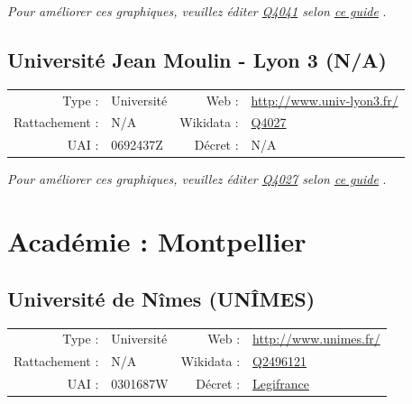 \documentclass[12pt,french,landscape]{article}
\begin{document}
\textit{\scriptsize Pour améliorer ces graphiques, veuillez éditer \href{https://www.wikidata.org/entity/Q4041}{Q4041}  selon \href{https://github.com/cpesr/wikidataESR/blob/master/Rmd/wikidataESR.md}{ce guide}}
.


\newpage

\hypertarget{universituxe9-jean-moulin---lyon-3-na}{%
\subsection{Université Jean Moulin - Lyon 3
(N/A)}\label{universituxe9-jean-moulin---lyon-3-na}}

\begin{tabular*}{0.45\textwidth}{rp{2cm}rl}  
\hline  
Type : & Université & Web : &\href{http://www.univ-lyon3.fr/}{http://www.univ-lyon3.fr/} \\  
Rattachement : & N/A & Wikidata : & \href{https://www.wikidata.org/entity/Q4027}{Q4027} \\  
UAI : & 0692437Z & Décret : & N/A \\  
\hline  
\end{tabular*}

\textit{\scriptsize Pour améliorer ces graphiques, veuillez éditer \href{https://www.wikidata.org/entity/Q4027}{Q4027}  selon \href{https://github.com/cpesr/wikidataESR/blob/master/Rmd/wikidataESR.md}{ce guide}}
.


\newpage

\hypertarget{acaduxe9mie-montpellier}{%
\section{Académie : Montpellier}\label{acaduxe9mie-montpellier}}

\hypertarget{universituxe9-de-nuxeemes-unuxeemes}{%
\subsection{Université de Nîmes
(UNÎMES)}\label{universituxe9-de-nuxeemes-unuxeemes}}

\begin{tabular*}{0.45\textwidth}{rp{2cm}rl}  
\hline  
Type : & Université & Web : &\href{http://www.unimes.fr/}{http://www.unimes.fr/} \\  
Rattachement : & N/A & Wikidata : & \href{https://www.wikidata.org/entity/Q2496121}{Q2496121} \\  
UAI : & 0301687W & Décret : & \href{http://www.legifrance.gouv.fr/affichTexte.do;jsessionid=3976DDB631865D070704985BB39F3EC7.tpdjo05v_1?cidTexte=JORFTEXT000025790064&categorieLien=id}{Legifrance} \\  
\hline  
\end{tabular*}
\end{document}
